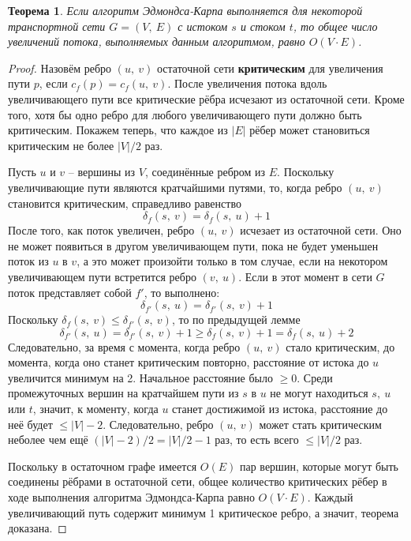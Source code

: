 \documentclass[a4paper,12pt]{article}
\newtheorem*{theorem}{Теорема}
\begin{document}
\begin{theorem}
Если алгоритм Эдмондса-Карпа выполняется для некоторой транспортной сети $G = (V,\ E)$ с истоком $s$ и стоком $t$, то общее число увеличений потока, выполняемых данным алгоритмом, равно $O(V \cdot E)$.
\end{theorem}
\begin{proof}
Назовём ребро $(u,\ v)$ остаточной сети \textbf{критическим} для увеличения пути $p$, если $c_f(p) = c_f(u,\ v)$. После увеличения потока вдоль увеличивающего пути все критические рёбра исчезают из остаточной сети. Кроме того, хотя бы одно ребро для любого увеличивающего пути должно быть критическим. Покажем теперь, что каждое из $|E|$ рёбер может становиться критическим не более $|V|\slash2$ раз.

Пусть $u$ и $v$ -- вершины из $V$, соединённые ребром из $E$. Поскольку увеличивающие пути являются кратчайшими путями, то, когда ребро $(u,\ v)$ становится критическим, справедливо равенство \[\delta_{f}(s,\ v) = \delta_{f}(s,\ u) + 1\]
После того, как поток увеличен, ребро $(u,\ v)$ исчезает из остаточной сети. Оно не может появиться в другом увеличивающем пути, пока не будет уменьшен поток из $u$ в $v$, а это может произойти только в том случае, если на некотором увеличивающем пути встретится ребро $(v,\ u)$. Если в этот момент в сети $G$ поток представляет собой $f'$, то выполнено: \[\delta_{f'}(s,\ u) = \delta_{f'}(s,\ v) + 1\]
Поскольку $\delta_{f}(s,\ v) \leqslant \delta_{f'}(s,\ v)$, то по предыдущей лемме \[\delta_{f'}(s,\ u) = \delta_{f'}(s,\ v) + 1 \geqslant \delta_{f}(s,\ v) + 1 = \delta_{f}(s,\ u) + 2\]
Следовательно, за время с момента, когда ребро $(u,\ v)$ стало критическим, до момента, когда оно станет критическим повторно, расстояние от истока до $u$ увеличится минимум на 2. Начальное расстояние было $\geqslant 0$. Среди промежуточных вершин на кратчайшем пути из $s$ в $u$ не могут находиться $s,\ u$ или $t$, значит, к моменту, когда $u$ станет достижимой из истока, расстояние до неё будет $\leqslant |V| - 2$. Следовательно, ребро $(u,\ v)$ может стать критическим неболее чем ещё $(|V| - 2)\slash2 = |V|\slash2 - 1$ раз, то есть всего $\leqslant |V| \slash 2$ раз.

Поскольку в остаточном графе имеется $O(E)$ пар вершин, которые могут быть соединены рёбрами в остаточной сети, общее количество критических рёбер в ходе выполнения алгоритма Эдмондса-Карпа равно $O(V \cdot E)$. Каждый увеличивающий путь содержит минимум 1 критическое ребро, а значит, теорема доказана.

\end{proof}
\end{document}
